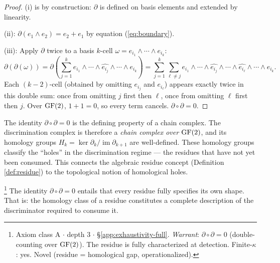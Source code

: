 \begin{proof}
(i) is by construction: $\partial$ is defined on basis
elements and extended by linearity.

(ii): $\partial(e_1 \wedge e_2) = e_2 + e_1$ by
equation (\ref{eq:boundary}).

(iii): Apply $\partial$ twice to a basis $k$-cell
$\omega = e_{i_1} \wedge \cdots \wedge e_{i_k}$:
\[
  \partial(\partial(\omega))
  = \partial\!\left(\sum_{j=1}^{k}
    e_{i_1} \wedge \cdots \wedge
    \widehat{e_{i_j}} \wedge \cdots \wedge e_{i_k}\right)
  = \sum_{j=1}^{k} \sum_{\ell \neq j}
    e_{i_1} \wedge \cdots \wedge \widehat{e_{i_j}}
    \wedge \cdots \wedge \widehat{e_{i_\ell}}
    \wedge \cdots \wedge e_{i_k}.
\]
Each $(k{-}2)$-cell (obtained by omitting $e_{i_j}$ and
$e_{i_\ell}$) appears exactly twice in this double sum:
once from omitting $j$ first then $\ell$, once from
omitting $\ell$ first then $j$. Over $\operatorname{GF}(2)$,
$1 + 1 = 0$, so every term cancels.
$\partial \circ \partial = 0$.
\end{proof}

\begin{remark}
The identity $\partial \circ \partial = 0$ is the defining
property of a chain complex. The discrimination complex is
therefore a \emph{chain complex over $\operatorname{GF}(2)$}, and its
homology groups $H_k = \ker \partial_k / \operatorname{im}
\partial_{k+1}$ are well-defined. These homology groups
classify the ``holes'' in the discrimination regime --- the
residues that have not yet been consumed. This connects the
algebraic residue concept (Definition \ref{def:residue})
to the topological notion of homological holes.
\end{remark}

\begin{theorem}\label{thm:exhaustive}\footnote{Axiom class \textsf{A} $\cdot$ depth 3 $\cdot$ \S\ref{app:exhaustivity-full}.  \emph{Warrant}: $\partial \circ \partial = 0$ (double-counting over $\operatorname{GF}(2)$). The residue is fully characterized at detection. Finite-$\kappa$: yes. Novel (residue = homological gap, operationalized).}
The identity $\partial \circ \partial = 0$ entails that every
residue fully specifies its own shape. That is: the homology
class of a residue constitutes a complete description of the
discriminator required to consume it.
\end{theorem}

